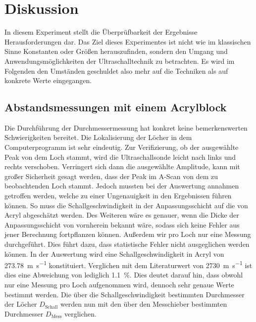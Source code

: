 


\section{Diskussion}
\label{sec:Diskussion}

In diesem Experiment stellt die Überprüfbarkeit der Ergebnisse Herausforderungen dar. 
Das Ziel dieses Experimentes ist nicht wie im klassischen Sinne Konstanten oder Größen 
herauszufinden, sondern den Umgang und Anwendungsmöglichkeiten der Ultraschalltechnik 
zu betrachten. Es wird im Folgenden den Umständen geschuldet also mehr auf die 
Techniken als auf konkrete Werte eingegangen. 

\subsection{Abstandsmessungen mit einem Acrylblock}
Die Durchführung der Durchmessermessung hat konkret keine bemerkenswerten Schwierigkeiten 
bereitet. Die Lokalisierung der Löcher in dem Computerprogramm ist sehr eindeutig. Zur 
Verifizierung, ob der ausgewählte Peak von dem Loch stammt, wird die Ultraschallsonde 
leicht nach links und rechts verschoben. Verringert sich dann die  ausgewählte Amplitude, 
kann mit großer Sicherheit gesagt werden, dass der Peak im A-Scan von dem zu beobachtenden 
Loch stammt. Jedoch mussten bei der Auswertung annahmen getroffen werden, welche zu einer 
Ungenauigkeit in den Ergebnissen führen können. So muss die Schallgeschwindigkeit in der 
Anpassungsschicht auf die von Acryl abgeschätzt werden. Des Weiteren wäre es genauer, wenn 
die Dicke der Anpassungsschicht von vornherein bekannt wäre, sodass sich keine Fehler aus 
jener Berechnung fortpflanzen können. Außerdem wir pro Loch nur eine Messung durchgeführt. 
Dies führt dazu, dass statistische Fehler nicht ausgeglichen werden können. In der Auswertung 
wird eine Schallgeschwindigkeit in Acryl von \qty{273,78}{\meter \per \second} konstituiert. 
Verglichen mit dem Literaturwert von \qty{2730}{\meter\per\second} ist dies eine Abweichung 
von lediglich \qty{1,1}{\percent}. Dies deutet darauf hin, dass obwohl nur eine Messung pro 
Loch aufgenommen wird, dennoch sehr genaue Werte bestimmt werden. Die über die 
Schallgeschwindigkeit bestimmten Durchmesser der Löcher $D_\text{Schall}$ werden nun mit den 
über den Messchieber bestimmten Durchmesser $D_\text{Mess}$ verglichen.

